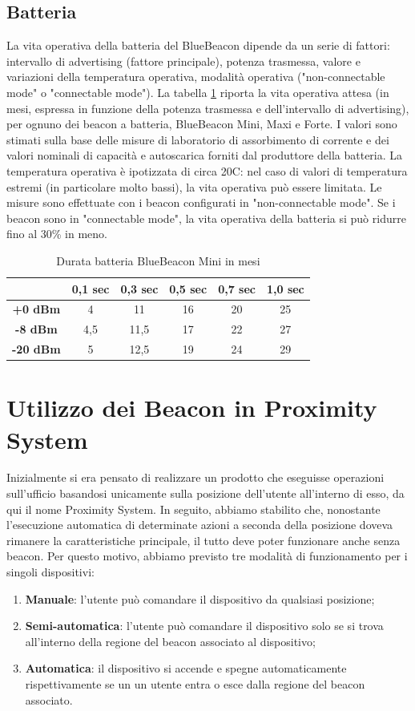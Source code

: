 \subsection{Batteria}
La vita operativa della batteria del BlueBeacon dipende da un serie di fattori: 
intervallo di advertising (fattore principale), potenza trasmessa, valore e variazioni della temperatura operativa, modalità operativa ("non-connectable mode" o "connectable mode"). 
La tabella \ref{tab:batteria} riporta la vita operativa attesa (in mesi, espressa in funzione della potenza trasmessa e dell'intervallo di advertising), per ognuno dei beacon a batteria, BlueBeacon Mini, Maxi e Forte. 
I valori sono stimati sulla base delle misure di laboratorio di assorbimento di corrente e dei valori nominali di capacità e autoscarica forniti dal produttore della batteria. 
La temperatura operativa è ipotizzata di circa 20C: nel caso di valori di temperatura estremi (in particolare molto bassi), la vita operativa può essere limitata. 
Le misure sono effettuate con i beacon configurati in "non-connectable mode". Se i beacon sono in "connectable mode", la vita operativa della batteria si può ridurre fino al 30\% in meno.
\begin{table}[htbp]
\begin{center}
\begin{tabular}{|c|c|c|c|c|c|}
\hline
 & 0,1 sec & 0,3 sec & 0,5 sec & 0,7 sec & 1,0 sec\\
\hline
\textbf{+0 dBm} & 4 & 11 & 16 & 20 & 25\\
\hline
\textbf{-8 dBm} & 4,5 & 11,5 & 17 & 22 & 27\\
\hline
\textbf{-20 dBm} & 5 & 12,5 & 19 & 24 & 29\\
\hline
\end{tabular}
\end{center}
\caption{Durata batteria BlueBeacon Mini in mesi}
\label{tab:batteria}
\end{table}

\section{Utilizzo dei Beacon in Proximity System}
Inizialmente si era pensato di realizzare un prodotto che eseguisse operazioni sull'ufficio basandosi unicamente sulla posizione dell'utente all'interno di esso, da qui il nome Proximity System.
In seguito, abbiamo stabilito che, nonostante l'esecuzione automatica di determinate azioni a seconda della posizione doveva rimanere la caratteristiche principale, il tutto deve poter funzionare anche senza beacon.
Per questo motivo, abbiamo previsto tre modalità di funzionamento per i singoli dispositivi:
\begin{enumerate}
\item \textbf{Manuale}: l'utente può comandare il dispositivo da qualsiasi posizione;
\item \textbf{Semi-automatica}: l'utente può comandare il dispositivo solo se si trova all'interno della regione del beacon associato al dispositivo; 
\item \textbf{Automatica}: il dispositivo si accende e spegne automaticamente rispettivamente se un un utente entra o esce dalla regione del beacon associato.
\end{enumerate}